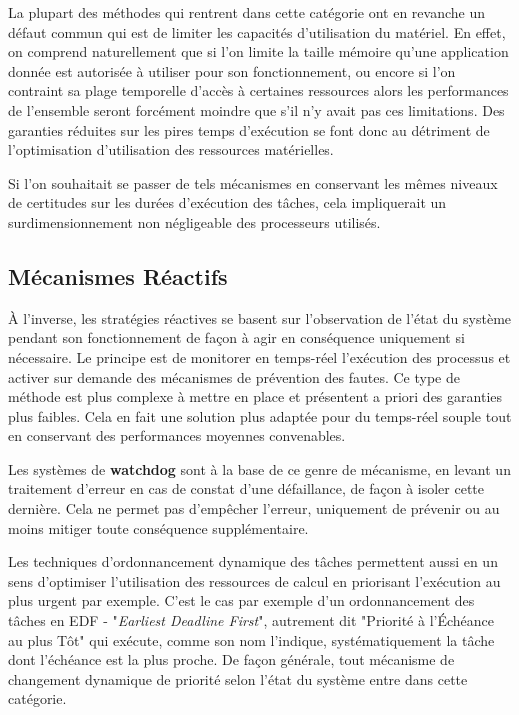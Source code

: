 \documentclass[french, a4paper, 11pt, twoside, pdftex]{StyleThese}
\begin{document}
		La plupart des méthodes qui rentrent dans cette catégorie ont en revanche un défaut commun qui est de limiter les capacités d'utilisation du matériel. En effet, on comprend naturellement que si l'on limite la taille mémoire qu'une application donnée est autorisée à utiliser pour son fonctionnement, ou encore si l'on contraint sa plage temporelle d'accès à certaines ressources alors les performances de l'ensemble seront forcément moindre que s'il n'y avait pas ces limitations. Des garanties réduites sur les pires temps d'exécution se font donc au détriment de l'optimisation d'utilisation des ressources matérielles. 
		
		Si l'on souhaitait se passer de tels mécanismes en conservant les mêmes niveaux de certitudes sur les durées d'exécution des tâches, cela impliquerait un surdimensionnement non négligeable des processeurs utilisés. 

	\subsection{Mécanismes Réactifs}
		À l'inverse, les stratégies réactives se basent sur l'observation de l'état du système pendant son fonctionnement de façon à agir en conséquence uniquement si nécessaire. Le principe est de monitorer en temps-réel l'exécution des processus et activer sur demande des mécanismes de prévention des fautes. Ce type de méthode est plus complexe à mettre en place et présentent a priori des garanties plus faibles. Cela en fait une solution plus adaptée pour du temps-réel souple tout en conservant des performances moyennes convenables. 
		
		Les systèmes de \textbf{watchdog} sont à la base de ce genre de mécanisme, en levant un traitement d'erreur en cas de constat d'une défaillance, de façon à isoler cette dernière. Cela ne permet pas d'empêcher l'erreur, uniquement de prévenir ou au moins mitiger  toute conséquence supplémentaire.
		
		Les techniques d'ordonnancement dynamique des tâches permettent aussi en un sens d'optimiser l'utilisation des ressources de calcul en priorisant l'exécution au plus urgent par exemple. C'est le cas par exemple d'un ordonnancement des tâches en EDF - "\textit{Earliest Deadline First}", autrement dit "Priorité à l'Échéance au plus Tôt" qui exécute, comme son nom l'indique, systématiquement la tâche dont l'échéance est la plus proche. De façon générale, tout mécanisme de changement dynamique de priorité selon l'état du système entre dans cette catégorie.
		
\end{document}
